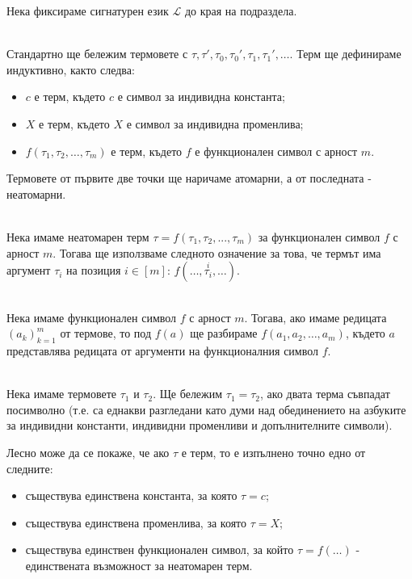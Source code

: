 \documentclass[12pt,twoside,a4paper]{article}
\begin{document}
	Нека фиксираме сигнатурен език $\mathcal{L}$ до края на подраздела.
	\begin{definition}[терм]\label{def:term}~\\
		\indent Стандартно ще бележим термовете с $\tau, \tau', \tau_0, \tau_0', \tau_1, \tau_1', \dots$. Терм ще дефинираме индуктивно, както следва:
		\begin{itemize}
			\item $c$ е терм, където $c$ е символ за индивидна константа;
			\item $X$ е терм, където $X$ е символ за индивидна променлива;
			\item $f(\tau_1,\tau_2,\dots,\tau_m)$ е терм, където $f$ е функционален символ с арност $m$.
		\end{itemize}
		Термовете от първите две точки ще наричаме атомарни, а от последната - неатомарни.
	\end{definition}
	
	\begin{denotation}~\\
		\indent Нека имаме неатомарен терм $\tau = f(\tau_1,\tau_2,...,\tau_m)$ за функционален символ $f$ с арност $m$. Тогава ще използваме следното означение за това, че термът има аргумент $\tau_i$ на позиция $i \in [m]$: $f(\dots,\overset{i}{\tau_i},\dots)$.
	\end{denotation}
	
	\begin{denotation}~\\
		\indent Нека имаме функционален символ $f$ с арност $m$. Тогава, ако имаме редицата $(a_k)_{k=1}^{m}$ от термове, то под $f(a)$ ще разбираме $f(a_1, a_2, \dots, a_m)$, където $a$ представлява редицата от аргументи на функционалния символ $f$.
	\end{denotation}
	
	\newpage
	\begin{denotation}~\\
		\indent Нека имаме термовете $\tau_1$ и $\tau_2$. Ще бележим $\tau_1 = \tau_2$, ако двата терма съвпадат посимволно (т.е. са еднакви разгледани като думи над обединението на азбуките за индивидни константи, индивидни променливи и допълнителните символи).
	\end{denotation}
	
	Лесно може да се покаже, че ако $\tau$ е терм, то е изпълнено точно едно от следните:
	\begin{itemize}
		\item съществува единствена константа, за която $\tau = c$;
		\item съществува единствена променлива, за която $\tau = X$;
		\item съществува единствен функционален символ, за който $\tau = f(\dots)$ - единствената възможност за неатомарен терм.
	\end{itemize}
	
\end{document}
